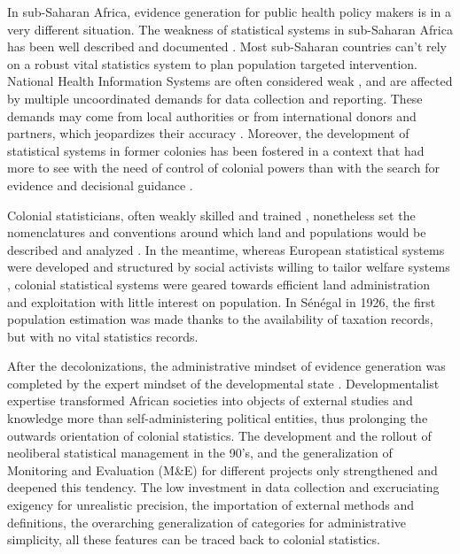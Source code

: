 In sub-Saharan Africa, evidence generation for public health policy makers is in a very different situation. The weakness of statistical systems in sub-Saharan Africa has been well described and documented \cite{jerven_poor_2013}. Most sub-Saharan countries can't rely on a robust vital statistics system to plan population targeted intervention. National Health Information Systems are often considered weak \cite{abou-zahr_better_2010,kiberu_strengthening_2014}, and are affected by multiple uncoordinated demands for data collection and reporting. These demands may come from local authorities or from international donors and partners, which jeopardizes their accuracy \cite{sandefur_political_2013} . Moreover, the development of statistical systems in former colonies has been fostered in a context that had more to see with the need of control of colonial powers than with the search for evidence and decisional guidance \cite{appadurai_number_1996,cordell_couting_2010,gervais_how_2010}.

Colonial statisticians, often weakly skilled and trained \cite{cordell_couting_2010,kateb_gestion_1998}, nonetheless set the nomenclatures and conventions around which land and populations would be described and analyzed \cite{rambert_cartographie_1922,gervais_how_2010}. In the meantime, whereas European statistical systems were developed and structured by social activists willing to tailor welfare systems \cite{desrosieres_politique_1993,desrosieres_administrator_1997}, colonial statistical systems were geared towards efficient land administration and exploitation \cite{rambert_cartographie_1922,de_martonne_cartographie_1931} with little interest on population. In Sénégal in 1926, the first population estimation was made thanks to the availability of taxation records, but with no vital statistics records\cite{rousseau_population_1929}.

After the decolonizations, the administrative mindset of evidence generation was completed by the expert mindset of the developmental state \cite{bonneuil_development_2000}. Developmentalist expertise transformed African societies into objects of external studies and knowledge more than self-administering political entities, thus prolonging the outwards orientation of colonial statistics. The development and the rollout of neoliberal statistical management in the 90's, and the generalization of Monitoring and Evaluation (M\&E) for different projects \cite{desrosieres_prouver_2014} only strengthened and deepened this tendency. The low investment in data collection and excruciating exigency for unrealistic precision, the importation of external methods and definitions, the overarching generalization of categories for administrative simplicity, all these features can be traced back to colonial statistics.


